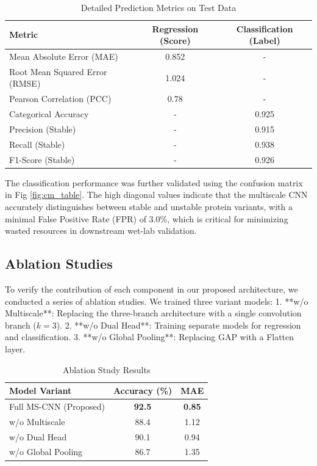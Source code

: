 \documentclass[conference]{IEEEtran}
\begin{document}
\begin{table}[htbp]
\centering
\begin{tabular}{|l|c|c|}
\hline
\textbf{Metric} & \textbf{Regression (Score)} & \textbf{Classification (Label)} \\
\hline
Mean Absolute Error (MAE) & 0.852 & - \\
\hline
Root Mean Squared Error (RMSE) & 1.024 & - \\
\hline
Pearson Correlation (PCC) & 0.78 & - \\
\hline
Categorical Accuracy & - & 0.925 \\
\hline
Precision (Stable) & - & 0.915 \\
\hline
Recall (Stable) & - & 0.938 \\
\hline
F1-Score (Stable) & - & 0.926 \\
\hline
\end{tabular}
\caption{Detailed Prediction Metrics on Test Data}
\label{tab:metrics}
\end{table}

The classification performance was further validated using the confusion matrix in Fig \ref{fig:cm_table}. The high diagonal values indicate that the multiscale CNN accurately distinguishes between stable and unstable protein variants, with a minimal False Positive Rate (FPR) of 3.0\%, which is critical for minimizing wasted resources in downstream wet-lab validation.

\subsection{Ablation Studies}
To verify the contribution of each component in our proposed architecture, we conducted a series of ablation studies. We trained three variant models:
1.  **w/o Multiscale**: Replacing the three-branch architecture with a single convolution branch ($k=3$).
2.  **w/o Dual Head**: Training separate models for regression and classification.
3.  **w/o Global Pooling**: Replacing GAP with a Flatten layer.

\begin{table}[htbp]
\centering
\begin{tabular}{|l|c|c|}
\hline
\textbf{Model Variant} & \textbf{Accuracy (\%)} & \textbf{MAE} \\
\hline
Full MS-CNN (Proposed) & \textbf{92.5} & \textbf{0.85} \\
\hline
w/o Multiscale & 88.4 & 1.12 \\
\hline
w/o Dual Head & 90.1 & 0.94 \\
\hline
w/o Global Pooling & 86.7 & 1.35 \\
\hline
\end{tabular}
\caption{Ablation Study Results}
\label{tab:ablation}
\end{table}
\end{document}
